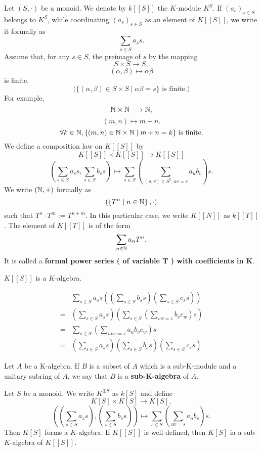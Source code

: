 \begin{exampleenv}
    Let $(S,\cdot)$ be a monoid. We denote by $k [\![S]\!]$ the $K$-module $K^S$. If $\left(a_s\right)_{s\in S}$ belongs to $K^S$, while coordinating $(a_s)_{s\in S}$ as an element of $K[\![S]\!]$, we write it formally as 
    $$\sum_{s\in S}a_s s.$$
    Assume that, for any $s\in S$, the preimage of $s$ by the mapping
    $$S\times S\longrightarrow S,$$
    $$(\alpha, \beta)\longmapsto \alpha\beta$$
    is finite.
    $$\text{(}\{\left(\alpha,\beta\right)\in S\times S\mid \alpha\beta=s\} \text{ is finite.}\text{)}$$
    For example, 
    $$\mathbb{N}\times \mathbb{N}\longrightarrow \mathbb{N},$$
    $$\left(m,n\right)\longmapsto m+n.$$
    $$\forall k\in \mathbb{N},\{(m,n)\in \mathbb{N}\times \mathbb{N}\mid m+n=k \} \text{ is finite.}$$
    We define a composition law on $K[\![S]\!]$ by
    $$K[\![S]\!]\times K[\![S]\!]\longrightarrow K[\![S]\!]$$
    $$\left(\sum_{s\in S}a_ss,\sum_{s\in S}b_ss\right)\longmapsto \sum_{s\in S}\left(\sum_{(u,v)\in S^2,uv=s}a_ub_v\right)s.$$
    We write $(\mathbb{N},+)$ formally as 
    $$\left(\left\{T^n\mid n\in \mathbb{N}\right\},\cdot\right)$$
    such that  $T^n\cdot T^m:=T^{n+m}$. In this particular case, we write $K [\![N]\!]$ as $k[\![T]\!]$. The element of $K[\![T]\!]$ is of the form
    $$\sum_{n\in \mathbb{N}}a_nT^n.$$
    It is called a \textbf{formal power series ( of variable T ) with coefficients in K}.

\end{exampleenv}
\begin{propositionenv}
    $K[\![S]\!]$ is a $K$-algebra.
\end{propositionenv}
\begin{proofenv}
    \begin{align*}
       & \sum_{s\in S} a_s s \left( \left( \sum_{s\in S} b_s s \right) \left( \sum_{s\in S} c_s s \right) \right)\\
        =&\left(\sum_{s\in S} a_s s \right)\left( \sum_{s\in S} \left(\sum_{vw=s}b_vc_w\right) s \right)\\
        = &\sum_{s\in S} \left( \sum_{uvw=s} a_u b_v c_w \right)s\\
        =& \left( \sum_{s\in S} a_s s \right)\left( \sum_{s\in S} b_s s \right) \left( \sum_{s\in S} c_s s \right) 
    \end{align*}


\end{proofenv}
\begin{definitionenv}
    Let $A$ be a K-algebra. If $B$ is a subset of $A$ which is a sub-K-module and a unitary subring of $A$, we say that $B$ is a \textbf{sub-K-algebra} of $A$.
\end{definitionenv}
\begin{exampleenv}
    Let $S$ be a monoid. We write $K^{\oplus S}$ as $k[S]$ and define 
    $$K[S]\times K[S]\longrightarrow K[S],$$
    $$\left(\left(\sum_{s\in S}a_s s\right),\left(\sum_{s\in S}b_s s\right)\right)\longmapsto \sum_{s\in S}\left(\sum_{uv=s}a_ub_v\right)s.$$
    Then $K[S]$ forms a $K$-algebra. If $K[\![S]\!]$ is well defined, then $K[S]$ ia a sub-$K$-algebra of $K[\![S]\!]$.
\end{exampleenv}



